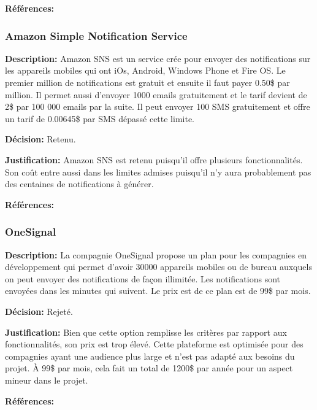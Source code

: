 \textbf{Références:} \cite{Urban_airship}

 
 
\subsubsection{Amazon Simple Notification Service}

\textbf{Description:} Amazon SNS est un service crée pour envoyer des notifications sur les appareils mobiles qui ont iOs, Android, Windows Phone et Fire OS. Le premier million de notifications est gratuit et ensuite il faut payer 0.50\$ par million. Il permet aussi d'envoyer 1000 emails gratuitement et le tarif devient de 2\$ par 100 000 emails par la suite. Il peut envoyer 100 SMS gratuitement et offre un tarif de 0.00645\$ par SMS dépassé cette limite.

\textbf{Décision:} Retenu.

\textbf{Justification:} Amazon SNS est retenu puisqu'il offre plusieurs fonctionnalités. Son coût entre aussi dans les limites admises puisqu'il n'y aura probablement pas des centaines de notifications à générer.

\textbf{Références:} \cite{Amazon_SNS}



\subsubsection{OneSignal}

\textbf{Description:} La compagnie OneSignal propose un plan pour les compagnies en développement qui permet d'avoir 30000 appareils mobiles ou de bureau auxquels on peut envoyer des notifications de façon illimitée. Les notifications sont envoyées dans les minutes qui suivent. Le prix est de ce plan est de 99\$ par mois.

\textbf{Décision:} Rejeté.

\textbf{Justification:} Bien que cette option remplisse les critères par rapport aux fonctionnalités, son prix est trop élevé. Cette plateforme est optimisée pour des compagnies ayant une audience plus large et n'est pas adapté aux besoins du projet. À 99\$ par mois, cela fait un total de 1200\$ par année pour un aspect mineur dans le projet.

\textbf{Références:} \cite{OneSignal}


